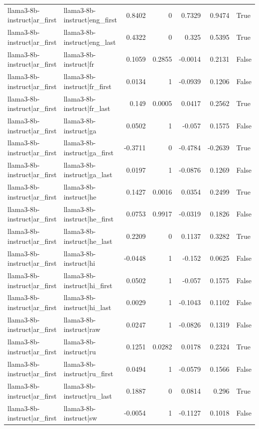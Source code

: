 \begin{table}
\begin{tabular}{l l r r r r l}
llama3-8b-instruct|ar_first & llama3-8b-instruct|eng_first & 0.8402 & 0 & 0.7329 & 0.9474 & True \\
llama3-8b-instruct|ar_first & llama3-8b-instruct|eng_last & 0.4322 & 0 & 0.325 & 0.5395 & True \\
llama3-8b-instruct|ar_first & llama3-8b-instruct|fr & 0.1059 & 0.2855 & -0.0014 & 0.2131 & False \\
llama3-8b-instruct|ar_first & llama3-8b-instruct|fr_first & 0.0134 & 1 & -0.0939 & 0.1206 & False \\
llama3-8b-instruct|ar_first & llama3-8b-instruct|fr_last & 0.149 & 0.0005 & 0.0417 & 0.2562 & True \\
llama3-8b-instruct|ar_first & llama3-8b-instruct|ga & 0.0502 & 1 & -0.057 & 0.1575 & False \\
llama3-8b-instruct|ar_first & llama3-8b-instruct|ga_first & -0.3711 & 0 & -0.4784 & -0.2639 & True \\
llama3-8b-instruct|ar_first & llama3-8b-instruct|ga_last & 0.0197 & 1 & -0.0876 & 0.1269 & False \\
llama3-8b-instruct|ar_first & llama3-8b-instruct|he & 0.1427 & 0.0016 & 0.0354 & 0.2499 & True \\
llama3-8b-instruct|ar_first & llama3-8b-instruct|he_first & 0.0753 & 0.9917 & -0.0319 & 0.1826 & False \\
llama3-8b-instruct|ar_first & llama3-8b-instruct|he_last & 0.2209 & 0 & 0.1137 & 0.3282 & True \\
llama3-8b-instruct|ar_first & llama3-8b-instruct|hi & -0.0448 & 1 & -0.152 & 0.0625 & False \\
llama3-8b-instruct|ar_first & llama3-8b-instruct|hi_first & 0.0502 & 1 & -0.057 & 0.1575 & False \\
llama3-8b-instruct|ar_first & llama3-8b-instruct|hi_last & 0.0029 & 1 & -0.1043 & 0.1102 & False \\
llama3-8b-instruct|ar_first & llama3-8b-instruct|raw & 0.0247 & 1 & -0.0826 & 0.1319 & False \\
llama3-8b-instruct|ar_first & llama3-8b-instruct|ru & 0.1251 & 0.0282 & 0.0178 & 0.2324 & True \\
llama3-8b-instruct|ar_first & llama3-8b-instruct|ru_first & 0.0494 & 1 & -0.0579 & 0.1566 & False \\
llama3-8b-instruct|ar_first & llama3-8b-instruct|ru_last & 0.1887 & 0 & 0.0814 & 0.296 & True \\
llama3-8b-instruct|ar_first & llama3-8b-instruct|sw & -0.0054 & 1 & -0.1127 & 0.1018 & False \\

\end{tabular}
\end{table}

